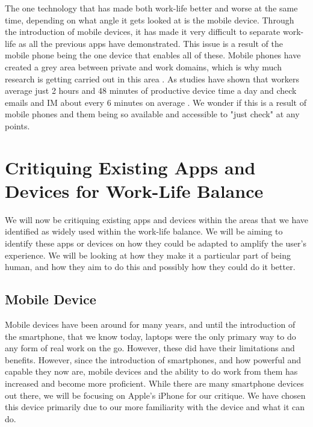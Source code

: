 \documentclass{sigchi}
\begin{document}
	The one technology that has made both work-life better and worse at the same time, depending on what angle it gets looked at is the mobile device. Through the introduction of mobile devices, it has made it very difficult to separate work-life \cite{gronvall2016hci, sadler2006balancing} as all the previous apps have demonstrated. This issue is a result of the mobile phone being the one device that enables all of these. Mobile phones have created a grey area between private and work domains, which is why much research is getting carried out in this area \cite{fleck2015balancing}. As studies have shown that workers average just 2 hours and 48 minutes of productive device time a day and check emails and IM about every 6 minutes on average \cite{rescuetime_study}. We wonder if this is a result of mobile phones and them being so available and accessible to "just check" at any points.
	
\section{Critiquing Existing Apps and Devices for Work-Life Balance}
	
	We will now be critiquing existing apps and devices within the areas that we have identified as widely used within the work-life balance. We will be aiming to identify these apps or devices on how they could be adapted to amplify the user's experience. We will be looking at how they make it a particular part of being human, and how they aim to do this and possibly how they could do it better.
	
	\subsection{Mobile Device}
		Mobile devices have been around for many years, and until the introduction of the smartphone, that we know today, laptops were the only primary way to do any form of real work on the go. However, these did have their limitations and benefits. However, since the introduction of smartphones, and how powerful and capable they now are, mobile devices and the ability to do work from them has increased and become more proficient. While there are many smartphone devices out there, we will be focusing on Apple's iPhone for our critique. We have chosen this device primarily due to our more familiarity with the device and what it can do. 
		
\end{document}
